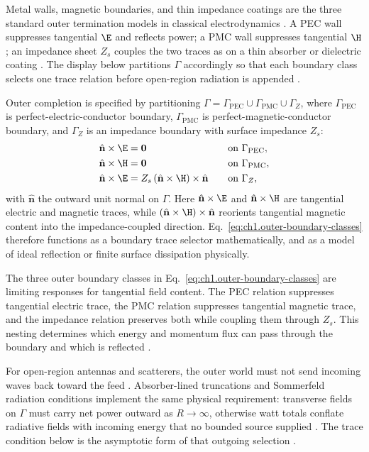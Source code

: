 Metal walls, magnetic boundaries, and thin impedance coatings are the three standard outer termination models in classical electrodynamics \cite{stratton1941}. A PEC wall suppresses tangential $\E$ and reflects power; a PMC wall suppresses tangential $\H$; an impedance sheet $Z_s$ couples the two traces as on a thin absorber or dielectric coating \cite{harrington2001}. The display below partitions $\Gamma$ accordingly so that each boundary class selects one trace relation before open-region radiation is appended \cite{stratton1941}.

Outer completion is specified by partitioning
\(\Gamma=\Gamma_{\mathrm{PEC}}\cup\Gamma_{\mathrm{PMC}}\cup\Gamma_Z\), where
\(\Gamma_{\mathrm{PEC}}\) is perfect-electric-conductor boundary,
\(\Gamma_{\mathrm{PMC}}\) is perfect-magnetic-conductor boundary, and \(\Gamma_Z\)
is an impedance boundary with surface impedance \(Z_s\):
\begin{equation}
\label{eq:ch1.outer-boundary-classes}
\begin{aligned}
\hat{\mathbf{n}}\times\E&=\mathbf{0}\quad &&\text{on }\Gamma_{\mathrm{PEC}},\\
\hat{\mathbf{n}}\times\H&=\mathbf{0}\quad &&\text{on }\Gamma_{\mathrm{PMC}},\\
\hat{\mathbf{n}}\times\E&=Z_s\,(\hat{\mathbf{n}}\times\H)\times\hat{\mathbf{n}}
\quad &&\text{on }\Gamma_Z,
\end{aligned}
\end{equation}
with \(\hat{\mathbf{n}}\) the outward unit normal on \(\Gamma\). Here
\(\hat{\mathbf{n}}\times\E\) and \(\hat{\mathbf{n}}\times\H\) are tangential
electric and magnetic traces, while \((\hat{\mathbf{n}}\times\H)\times\hat{\mathbf{n}}\)
reorients tangential magnetic content into the impedance-coupled direction.
Eq.~\eqref{eq:ch1.outer-boundary-classes} therefore functions as a boundary
trace selector mathematically, and as a model of ideal reflection or finite
surface dissipation physically.

The three outer boundary classes in Eq.~\eqref{eq:ch1.outer-boundary-classes} are limiting responses for tangential field
content. The PEC relation suppresses tangential electric trace, the PMC relation
suppresses tangential magnetic trace, and the impedance relation preserves both
while coupling them through \(Z_s\). This nesting determines which energy and
momentum flux can pass through the boundary and which is reflected
\cite{stratton1941}.

For open-region antennas and scatterers, the outer world must not send incoming waves back toward the feed \cite{stratton1941}. Absorber-lined truncations and Sommerfeld radiation conditions implement the same physical requirement: transverse fields on $\Gamma$ must carry net power outward as $R\to\infty$, otherwise watt totals conflate radiative fields with incoming energy that no bounded source supplied \cite{hansen1988}. The trace condition below is the asymptotic form of that outgoing selection \cite{sommerfeld1949}.

